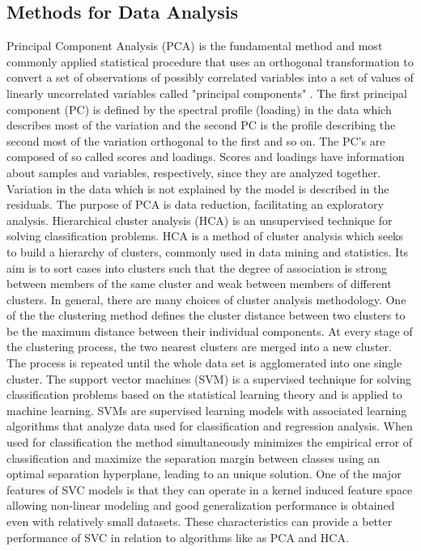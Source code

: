 \documentclass[sigplan]{acmart}
\begin{document}
\subsection{Methods for Data Analysis}
Principal Component Analysis (PCA) is the fundamental method and most commonly applied statistical procedure that uses an orthogonal transformation to convert a set of observations of possibly correlated variables into a set of values of linearly uncorrelated variables called "principal components" \cite{Peters2015}. The first principal component (PC) is defined by the spectral profile (loading) in the data which describes most of the variation and the second PC is the profile describing the second most of the variation orthogonal to the first and so on. The PC's are composed of so called scores and loadings. Scores and loadings have information about samples and variables, respectively, since they are analyzed together. Variation in the data which is not explained by the model is described in the residuals. The purpose of PCA is data reduction, facilitating an exploratory analysis.
Hierarchical cluster analysis (HCA) is an unsupervised technique for solving classification problems. HCA is a method of cluster analysis which seeks to build a hierarchy of clusters, commonly used in data mining and statistics. Its aim is to sort cases into clusters such that the degree of association is strong between members of the same cluster and weak between members of different clusters. In general, there are many choices of cluster analysis methodology. One of the the clustering method defines the cluster distance between two clusters to be the maximum distance between their individual components. At every stage of the clustering process, the two nearest clusters are merged into a new cluster. The process is repeated until the whole data set is agglomerated into one single cluster.
The support vector machines (SVM) is a supervised technique for solving classification problems based on the statistical learning theory and is applied to machine learning. SVMs are supervised learning models with associated learning algorithms that analyze data used for classification and regression analysis. When used for classification the method simultaneously minimizes the empirical error of classification and maximize the separation margin between classes using an optimal separation hyperplane, leading to an unique solution. One of the major features of SVC models is that they can operate in a kernel induced feature space allowing non-linear modeling and good generalization performance is obtained even with relatively small datasets. These characteristics can provide a better performance of SVC in relation to algorithms like as PCA and HCA.
\end{document}
